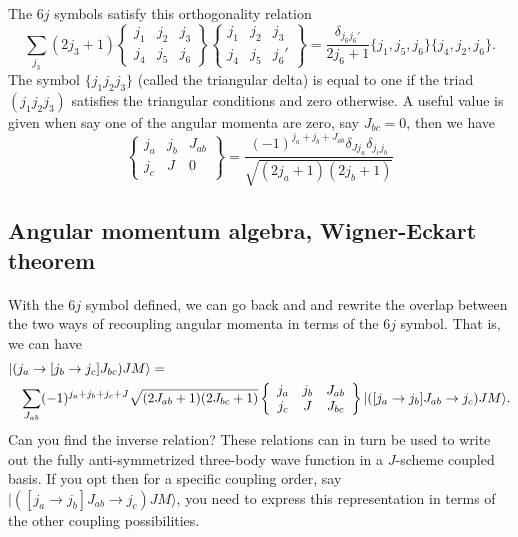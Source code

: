 \documentclass[%
twoside,                 %
final,                   %
10pt]{article}
\begin{document}
\paragraph{}
The $6j$ symbols satisfy this orthogonality relation
\[
    \sum_{j_3} (2j_3+1) \begin{Bmatrix} j_1 & j_2 & j_3\\ j_4 & j_5 & j_6 \end{Bmatrix} \begin{Bmatrix} j_1 & j_2 & j_3\\ j_4 & j_5 & j_6' \end{Bmatrix} = \frac{\delta_{j_6^{}j_6'}}{2j_6+1} \{j_1,j_5,j_6\} \{j_4,j_2,j_6\}. 
\]
The symbol $\{j_1j_2j_3\}$ (called the triangular delta) is equal to one if the triad $(j_1j_2j_3)$ satisfies the triangular conditions and zero otherwise.
A useful value is given when say one of the angular momenta are zero, say $J_{bc}=0$, then we have
\[
\left\{\begin{array}{ccc} j_a & j_b& J_{ab} \\ j_c & J & 0 \end{array}\right\}=\frac{(-1)^{j_a+j_b+J_{ab}}\delta_{Jj_a}\delta_{j_cj_b} }{\sqrt{(2j_{a}+1)(2j_{b}+1)}}
\]



\subsection{Angular momentum algebra, Wigner-Eckart theorem}

\paragraph{}
With the $6j$ symbol defined, we can go back and and rewrite the overlap between the two ways of recoupling angular momenta in terms of the $6j$ symbol.
That is, we can have  
\begin{eqnarray}
\nonumber
\lefteqn{| (j_a\rightarrow [j_b\rightarrow j_c]J_{bc}) JM\rangle = } \\
\nonumber
& &\sum_{J_{ab}}(-1)^{j_a+j_b+j_c+J}\sqrt{(2J_{ab}+1)(2J_{bc}+1)}\left\{\begin{array}{ccc} j_a & j_b& J_{ab} \\ j_c & J & J_{bc} \end{array}\right\}| ([j_a\rightarrow j_b]J_{ab}\rightarrow j_c) JM\rangle
. \nonumber
\end{eqnarray}
Can you find the inverse relation?  
These relations can in turn be used to write out the fully anti-symmetrized three-body wave function in a $J$-scheme coupled basis. 
If you opt then for a specific coupling order, say $| ([j_a\rightarrow j_b]J_{ab}\rightarrow j_c) JM\rangle$, you need to express this representation in terms of the other coupling possibilities.
\end{document}
